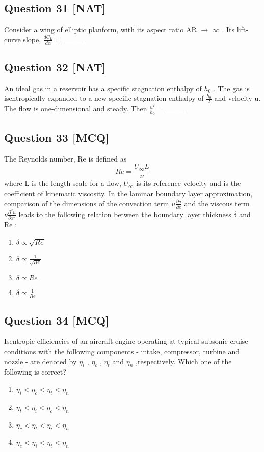 \documentclass[12pt,a4paper]{article}
\begin{document}
\subsection*{Question 31 [NAT]}
Consider a wing of elliptic planform, with its aspect ratio AR $\rightarrow$ $\infty$ . Its lift-curve slope, $\frac{dC_L}{d\alpha}$ =  \_\_\_\_ 


\subsection*{Question 32 [NAT]}
An ideal gas in a reservoir has a specific stagnation enthalpy of $h_0$ . The gas is isentropically expanded to a new specific stagnation enthalpy of $\frac{h_0}{2}$ and velocity u. The flow is one-dimensional and steady. Then $\frac{u^2}{h_0}$ = \_\_\_\_


\subsection*{Question 33 [MCQ]}
The Reynolds number, Re is defined as \[Re = \frac{U_{\infty} L}{\nu}\] where L is the length scale for a flow, {$U_{\infty}$} is its reference velocity and \nu  is the coefficient of kinematic viscosity. In the laminar boundary layer approximation, comparison of the dimensions of the convection term $u \frac{\partial u}{\partial x}$ and the viscous term $\nu\frac{\partial^2 u}{\partial x^2}$ leads to the following relation between the boundary layer thickness $\delta$ and Re :
\begin{enumerate}[label=(\alph*)]
\item  $\delta \propto \sqrt{Re}$
\item  $\delta \propto \frac{1}{\sqrt{Re}}$
\item  $\delta \propto {Re}$
\item  $\delta \propto \frac{1}{Re}$
\end{enumerate}



\subsection*{Question 34 [MCQ]}
Isentropic efficiencies of an aircraft engine operating at typical subsonic cruise conditions with the following components - intake, compressor, turbine and nozzle - are denoted by $\eta_i$ , $\eta_c$ , $\eta_t$ and $\eta_n$ ,respectively. Which one of the following is correct?
\begin{enumerate}[label=(\alph*)]
\item $\eta_i < \eta_c < \eta_t < \eta_n$
\item  $\eta_t < \eta_i < \eta_c < \eta_n$
\item  $\eta_c < \eta_t < \eta_i < \eta_n$
\item  $\eta_c < \eta_i < \eta_t < \eta_n$
\end{enumerate}
\end{document}
